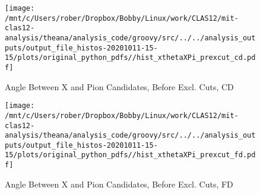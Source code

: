 \documentclass{article}
\begin{document}
\begin{landscape}
    \begin{figure}[h]
        \centering

        \texttt{[image: /mnt/c/Users/rober/Dropbox/Bobby/Linux/work/CLAS12/mit-clas12-analysis/theana/analysis\_code/groovy/src/../../analysis\_outputs/output\_file\_histos-20201011-15-15/plots/original\_python\_pdfs//hist\_xthetaXPi\_prexcut\_cd.pdf]}
        \captionsetup{textformat=empty,labelformat=blank}
        \caption{Angle Between X and Pion Candidates, Before Excl. Cuts, CD}
    \end{figure}
    \clearpage
    
    \begin{figure}[h]
        \centering

        \texttt{[image: /mnt/c/Users/rober/Dropbox/Bobby/Linux/work/CLAS12/mit-clas12-analysis/theana/analysis\_code/groovy/src/../../analysis\_outputs/output\_file\_histos-20201011-15-15/plots/original\_python\_pdfs//hist\_xthetaXPi\_prexcut\_fd.pdf]}
        \captionsetup{textformat=empty,labelformat=blank}
        \caption{Angle Between X and Pion Candidates, Before Excl. Cuts, FD}
    \end{figure}
    \clearpage
    
	\end{landscape}
	
\end{document}

